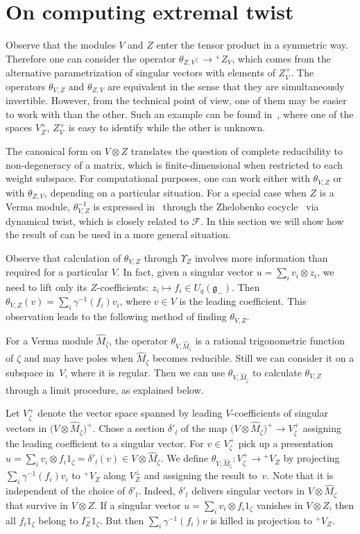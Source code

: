\documentclass[pdftex]{sigma}
\numberwithin{equation}{section}
\begin{document}
\section{On computing extremal twist}
Observe that the modules $V$ and $Z$ enter the tensor product in a symmetric way. Therefore one can consider the operator $\theta_{Z,V}\colon \to {}^+\!Z_V$, which comes from the alternative parametrization of singular vectors with elements of $ Z^+_V$. The operators $\theta_{V,Z}$ and $\theta_{Z,V}$ are equivalent in the sense that they are simultaneously invertible. However, from the technical point of view, one of them may be easier to work with than the other. Such an example can be found in~\cite{M1}, where one of the spaces $ V^+_Z$, $ Z^+_V$ is easy to identify while the other is unknown.

The canonical form on $V\otimes Z$ translates the question of complete reducibility to non-dege\-ne\-ra\-cy of a matrix, which is finite-dimensional when restricted to each weight subspace. For computational purposes, one can work either with $\theta_{V,Z}$ or with $\theta_{Z,V}$, depending on a particular situation. For a special case when $Z$ is a Verma module, $\theta^{-1}_{V,Z}$ is expressed in~\cite{EV} through the Zhelobenko cocycle~\cite{Zh} via dynamical twist, which is closely related to $\mathcal{F}$. In this section we will show how the result of \cite{EV} can be used in a more general situation.

 Observe that calculation of $\theta_{V,Z}$ through $\Upsilon_Z$ involves more information than required for a particular $V$. In fact, given a singular vector $u=\sum_i v_i\otimes z_i$, we need to lift only its $Z$-coefficients: $z_i\mapsto f_i\in U_q(\mathfrak{g}_-)$. Then $\theta_{V,Z}(v)= \sum_{i}\gamma^{-1}(f_i)v_i$, where $v\in V$ is the leading coefficient. This observation leads to the following method of finding $\theta_{V,Z}$.

 For a Verma module $\hat M_\zeta$, the operator $\theta_{V,\hat M_\zeta}$ is a rational trigonometric function of $\zeta$ and may have poles when $\hat M_\zeta$ becomes reducible. Still we can consider it on a subspace in~$V$, where it is regular. Then we can use $\theta_{V,\hat M_\zeta}$ to calculate $\theta_{V,Z}$ through a limit procedure, as explained below.

 Let $V^+_{\zeta}$ denote the vector space spanned by leading $V$-coefficients of singular vectors in $\big(V\otimes \hat M_\zeta\big)^+$. Chose a section $\delta'_l$ of the map $\big(V\otimes \hat M_\zeta\big)^+\to V^+_\zeta$ assigning the leading coefficient to a singular vector. For $v\in V^+_{\zeta}$ pick up a presentation $u=\sum_i v_i\otimes f_i1_\zeta =\delta'_l(v)\in V\otimes \hat M_\zeta$. We define $\theta_{V,\hat M_\zeta}\colon V^+_\zeta\to {}^+\!V_Z$ by projecting $\sum_{i}\gamma^{-1}(f_i)v_i$ to ${}^+\!V_Z$ along $V^\perp_Z$ and assigning the result to~$v$. Note that it is independent of the choice of $\delta'_l$. Indeed, $\delta'_l$ delivers singular vectors in $V\otimes \hat M_\zeta$ that survive in $V\otimes Z$. If a singular vector $u=\sum_i v_i\otimes f_i1_\zeta$ vanishes in $V\otimes Z$, then all $f_i1_\zeta$ belong to $I^-_Z1_\zeta$. But then $\sum_{i}\gamma^{-1}(f_i)v$ is killed in projection to ${}^+\!V_Z$.
\end{document}
